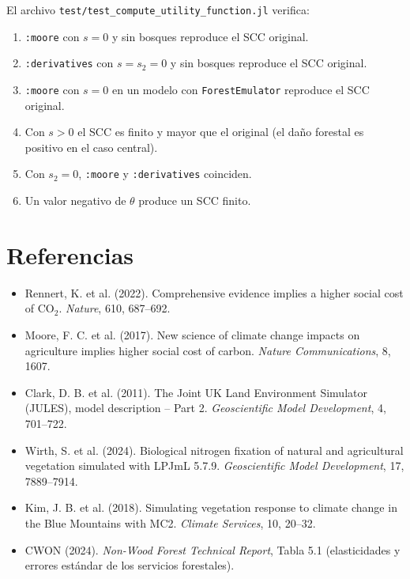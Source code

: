 \documentclass[11pt,a4paper]{article}
\begin{document}
El archivo \texttt{test/test\_compute\_utility\_function.jl} verifica:
\begin{enumerate}
  \item \texttt{:moore} con \(s=0\) y sin bosques reproduce el SCC original.
  \item \texttt{:derivatives} con \(s=s_2=0\) y sin bosques reproduce el SCC
        original.
  \item \texttt{:moore} con \(s=0\) en un modelo con \texttt{ForestEmulator}
        reproduce el SCC original.
  \item Con \(s>0\) el SCC es finito y mayor que el original (el daño
        forestal es positivo en el caso central).
  \item Con \(s_2=0\), \texttt{:moore} y \texttt{:derivatives} coinciden.
  \item Un valor negativo de \(\theta\) produce un SCC finito.
\end{enumerate}

\section{Referencias}

\begin{itemize}
  \item Rennert, K. et al. (2022). Comprehensive evidence implies a higher
        social cost of CO\(_2\). \emph{Nature}, 610, 687--692.
  \item Moore, F. C. et al. (2017). New science of climate change impacts on
        agriculture implies higher social cost of carbon.
        \emph{Nature Communications}, 8, 1607.
  \item Clark, D. B. et al. (2011). The Joint UK Land Environment Simulator
        (JULES), model description -- Part 2.
        \emph{Geoscientific Model Development}, 4, 701--722.
  \item Wirth, S. et al. (2024). Biological nitrogen fixation of natural and
        agricultural vegetation simulated with LPJmL 5.7.9.
        \emph{Geoscientific Model Development}, 17, 7889--7914.
  \item Kim, J. B. et al. (2018). Simulating vegetation response to climate
        change in the Blue Mountains with MC2.
        \emph{Climate Services}, 10, 20--32.
  \item CWON (2024). \emph{Non-Wood Forest Technical Report}, Tabla 5.1
        (elasticidades y errores estándar de los servicios forestales).
\end{itemize}
\end{document}
